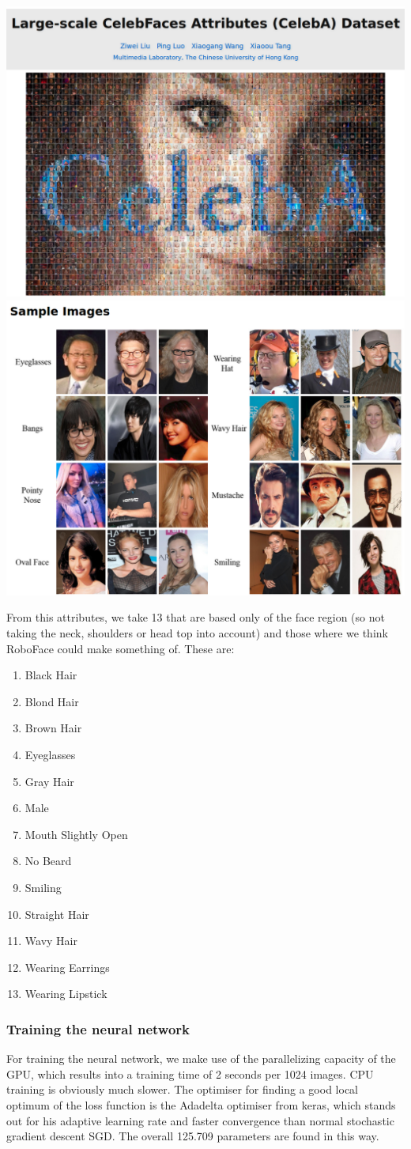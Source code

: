\documentclass[12.5pt]{scrartcl}
\begin{document}
	\includegraphics[width=0.5\linewidth]{images/CelebA} \\
	\includegraphics[width=0.5\linewidth]{images/CelebAExamples}
	
	From this attributes, we take 13 that are based only of the face region (so not taking the neck, shoulders or head top into account) and those where we think RoboFace could make something of. These are:
		\begin{enumerate}
			\item Black Hair
			\item Blond Hair
			\item Brown Hair
			\item Eyeglasses
			\item Gray Hair
			\item Male
			\item Mouth Slightly Open
			\item No Beard
			\item Smiling
			\item Straight Hair
			\item Wavy Hair
			\item Wearing Earrings
			\item Wearing Lipstick
		\end{enumerate}
	\subsubsection{Training the neural network}
	For training the neural network, we make use of the parallelizing capacity of the GPU, which results into a training time of 2 seconds per 1024 images. CPU training is obviously much slower.
	The optimiser for finding a good local optimum of the loss function is the Adadelta optimiser from keras, which stands out for his adaptive learning rate and faster convergence than normal stochastic gradient descent SGD. The overall 125.709 parameters are found in this way.
\end{document}
